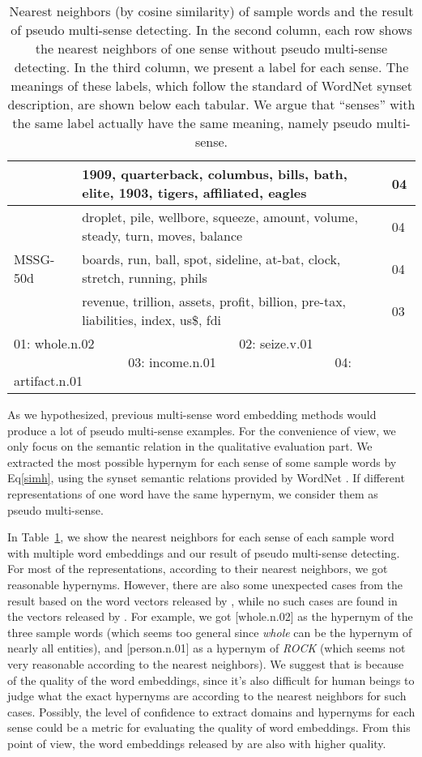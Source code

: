 \documentclass[11pt]{article}
\begin{document}
\begin{table}[htbp]
\begin{tabular}{|l|l|l|}
&1909, quarterback, columbus, bills, bath, elite, 1903, tigers, affiliated, eagles&04\\
\hline
\multirow{3}{*}{MSSG-50d} 
&droplet, pile, wellbore, squeeze, amount, volume, steady, turn, moves, balance&04\\
&boards, run, ball, spot, sideline, at-bat, clock, stretch, running, phils&04\\
&revenue, trillion, assets, profit, billion, pre-tax, liabilities, index, us\$, fdi&03\\
\hline
\multicolumn{3}{l}{01: whole.n.02 ~~~~~~~~~~~~~~~~~~~~~ 02: seize.v.01 ~~~~~~~~~~~~~~~~~ 03: income.n.01 ~~~~~~~~~~~~~~~~~ 04: artifact.n.01}
\end{tabular}
\caption{\label{nntable} Nearest neighbors (by cosine similarity) of sample words and the result of pseudo multi-sense detecting. In the second column, each row shows the nearest neighbors of one sense without pseudo multi-sense detecting. In the third column, we present a label for each sense. The meanings of these labels, which follow the standard of WordNet synset description, are shown below each tabular. We argue that ``senses'' with the same label actually have the same meaning, namely pseudo multi-sense.}
\end{table}
\par
As we hypothesized, previous multi-sense word embedding methods would produce a lot of pseudo multi-sense examples. For the convenience of view, we only focus on the semantic relation in the qualitative evaluation part. We extracted the most possible hypernym for each sense of some sample words by Eq\eqref{simh}, using the synset semantic relations provided by WordNet \cite{miller1995wordnet}. If different representations of one word have the same hypernym, we consider them as pseudo multi-sense. 
\par
In Table~\ref{nntable}, we show the nearest neighbors for each sense of each sample word with multiple word embeddings and our result of pseudo multi-sense detecting. For most of the representations, according to their nearest neighbors, we got reasonable hypernyms. However, there are also some unexpected cases from the result based on the word vectors released by , while no such cases are found in the vectors released by . For example, we got [whole.n.02] as the hypernym of the three sample words (which seems too general since {\sl whole} can be the hypernym of nearly all entities), and [person.n.01] as a hypernym of {\sl ROCK} (which seems not very reasonable according to the nearest neighbors). We suggest that is because of the quality of the word embeddings, since it's also difficult for human beings to judge what the exact hypernyms are according to the nearest neighbors for such cases. Possibly, the level of confidence to extract domains and hypernyms for each sense could be a metric for evaluating the quality of word embeddings. From this point of view, the word embeddings released by  are also with higher quality.
\end{document}
